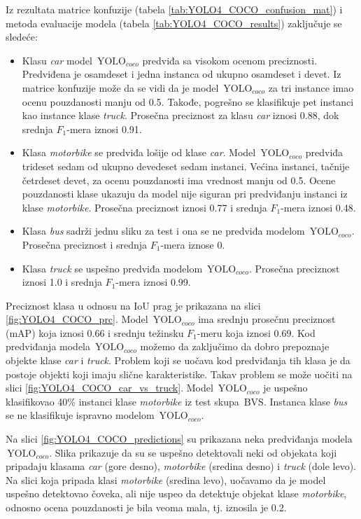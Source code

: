 \documentclass[12pt,oneside]{memoir}
\newcommand{\yolo}{\ensuremath{\,\textrm{YOLO}}}
\newcommand{\bvs}{\ensuremath{\,\textrm{BVS}}}
\begin{document}
Iz rezultata matrice konfuzije (tabela \ref{tab:YOLO4_COCO_confusion_mat}) i metoda evaluacije modela (tabela \ref{tab:YOLO4_COCO_results}) zaključuje se sledeće:
\begin{itemize}
    \item Klasu \textit{car} model $\yolo_{coco}$ predviđa sa visokom ocenom preciznosti. Predviđena je osamdeset i jedna instanca od ukupno osamdeset i devet. Iz matrice konfuzije može da se vidi da je model $\yolo_{coco}$ za tri instance imao ocenu pouzdanosti manju od 0.5. Takođe, pogrešno se klasifikuje pet instanci kao instance klase \textit{truck}. Prosečna preciznost za klasu \textit{car} iznosi 0.88, dok srednja $F_1$-mera iznosi 0.91.
    \item Klasa \textit{motorbike} se predviđa lošije od klase \textit{car}. Model $\yolo_{coco}$ predviđa trideset sedam od ukupno devedeset sedam instanci. Većina instanci, tačnije četrdeset devet, za ocenu pouzdanosti ima vrednost manju od 0.5. Ocene pouzdanosti klase ukazuju da model nije siguran pri predviđanju instanci iz klase \textit{motorbike}. Prosečna preciznost iznosi 0.77 i srednja $F_1$-mera iznosi 0.48.
    \item Klasa \textit{bus} sadrži jednu sliku za test i ona se ne predviđa modelom $\yolo_{coco}$. Prosečna preciznost i srednja $F_1$-mera iznose 0.
    \item Klasa \textit{truck} se uspešno predviđa modelom $\yolo_{coco}$. Prosečna preciznost iznosi 1.0 i srednja $F_1$-mera iznosi 0.99.
\end{itemize}

Preciznost klasa u odnosu na IoU prag je prikazana na slici \ref{fig:YOLO4_COCO_prc}. Model $\yolo_{coco}$ ima srednju prosečnu preciznost (mAP) koja iznosi 0.66 i srednju težinsku $F_1$-meru koja iznosi 0.69. Kod predviđanja modela $\yolo_{coco}$ možemo da zaključimo da dobro prepoznaje objekte klase \textit{car} i \textit{truck}. Problem koji se uočava kod predviđanja tih klasa je da postoje objekti koji imaju slične karakteristike. Takav problem se može uočiti na slici \ref{fig:YOLO4_COCO_car_vs_truck}. Model $\yolo_{coco}$ je uspešno klasifikovao 40\% instanci klase \textit{motorbike} iz test skupa \bvs. Instanca klase \textit{bus} se ne klasifikuje ispravno modelom  $\yolo_{coco}$.

Na slici \ref{fig:YOLO4_COCO_predictions} su prikazana neka predviđanja modela $\yolo_{coco}$. Slika prikazuje da su se uspešno detektovali neki od objekata koji pripadaju klasama \textit{car} (gore desno), \textit{motorbike} (sredina desno) i \textit{truck} (dole levo). Na slici koja pripada klasi \textit{motorbike} (sredina levo), uočavamo da je model uspešno detektovao čoveka, ali nije uspeo da detektuje objekat klase \textit{motorbike}, odnosno ocena pouzdanosti je bila veoma mala, tj. iznosila je 0.2. 
\end{document}
